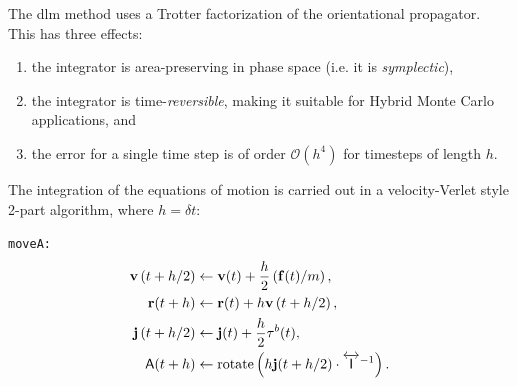 \documentclass[]{book}
\begin{document}
The {\sc dlm} method uses a Trotter factorization of the orientational
propagator.  This has three effects:
\begin{enumerate}
\item the integrator is area-preserving in phase space (i.e. it is
{\it symplectic}),
\item the integrator is time-{\it reversible}, making it suitable for Hybrid
Monte Carlo applications, and
\item the error for a single time step is of order $\mathcal{O}\left(h^4\right)$
for timesteps of length $h$.
\end{enumerate}

The integration of the equations of motion is carried out in a
velocity-Verlet style 2-part algorithm, where $h= \delta t$:

{\tt moveA:}
\begin{align*}
{\bf v}\left(t + h / 2\right)  &\leftarrow  {\bf v}(t) 
	+ \frac{h}{2} \left( {\bf f}(t) / m \right), \\
%
{\bf r}(t + h) &\leftarrow {\bf r}(t) 
	+ h  {\bf v}\left(t + h / 2 \right), \\
%
{\bf j}\left(t + h / 2 \right)  &\leftarrow {\bf j}(t) 
	+ \frac{h}{2} {\bf \tau}^b(t), \\
%
\mathsf{A}(t + h) &\leftarrow \mathrm{rotate}\left( h {\bf j}
	(t + h / 2) \cdot \overleftrightarrow{\mathsf{I}}^{-1} \right).
\end{align*}
\end{document}
